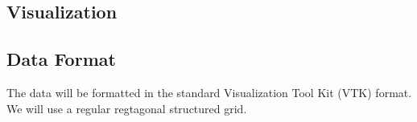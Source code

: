\subsection{Visualization}




\subsection{Data Format}

The data will be formatted in the standard Visualization Tool Kit (VTK) format. We will use a regular regtagonal structured grid.